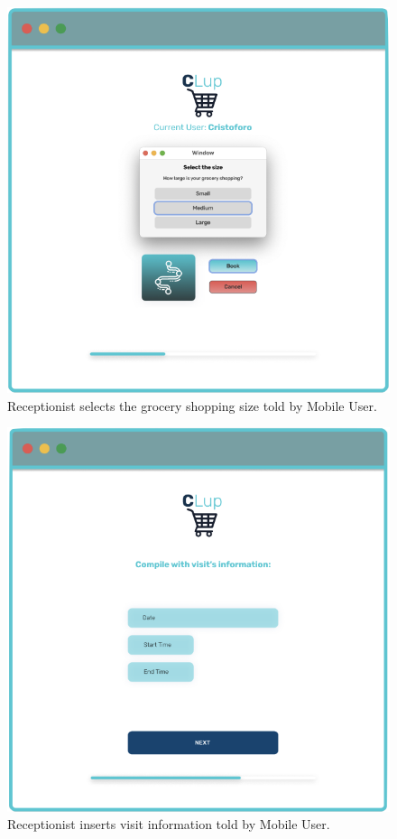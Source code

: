 \begin{figure}[h]
  \caption{Receptionist selects the grocery shopping size told by Mobile User.}
  \label{fig:Login}
  \centering
  \includegraphics[scale=0.35]{images/mockup/Size_Rec.png}

\end{figure}


\begin{figure}[h]
  \caption{Receptionist inserts visit information told by Mobile User.}
  \label{fig:Login}
  \centering
  \includegraphics[scale=0.35]{images/mockup/info_visit_rec.png}

\end{figure}

